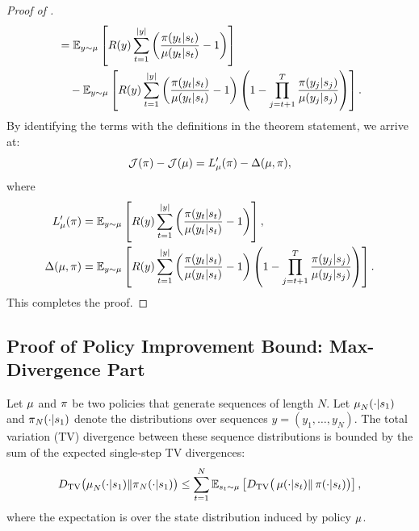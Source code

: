 \begin{proof}[Proof of ]
\begin{align*}
&= \mathbb{E}_{y \sim \rolloutpi} \left[ R(y) \sum_{t=1}^{|y|} \left( \frac{\trainerpi(y_t|s_t)}{\rolloutpi(y_t|s_t)} - 1 \right) \right] \\  
& \quad - \mathbb{E}_{y \sim \rolloutpi} \left[ R(y) \sum_{t=1}^{|y|} \left( \frac{\trainerpi(y_t|s_t)}{\rolloutpi(y_t|s_t)} - 1 \right) \left( 1 -  \prod_{j=t+1}^{T} \frac{\trainerpi(y_j|s_j)}{\rolloutpi(y_j|s_j)}   \right) \right].  
\end{align*}  
By identifying the terms with the definitions in the theorem statement, we arrive at:  
\begin{equation*}  
\mathcal{J}(\trainerpi) - \mathcal{J}(\rolloutpi) = L_{\rolloutpi}'(\trainerpi) - \Delta(\rolloutpi, \trainerpi),  
\end{equation*}  
where  
\begin{align*}  
L_{\rolloutpi}'(\trainerpi) &= \mathbb{E}_{y \sim \rolloutpi} \left[ R(y) \sum_{t=1}^{|y|} \left( \frac{\trainerpi(y_t|s_t)}{\rolloutpi(y_t|s_t)} - 1 \right) \right], \\  
\Delta(\rolloutpi, \trainerpi) &= \mathbb{E}_{y \sim \rolloutpi} \left[ R(y) \sum_{t=1}^{|y|} \left( \frac{\trainerpi(y_t|s_t)}{\rolloutpi(y_t|s_t)} - 1 \right) \left( 1 - \prod_{j=t+1}^{T} \frac{\trainerpi(y_j|s_j)}{\rolloutpi(y_j|s_j)} \right) \right].  
\end{align*}  
This completes the proof.  
\end{proof}


\subsection{Proof of Policy Improvement Bound: Max-Divergence Part}

\begin{lemma}  
\label{lem:sequence_tv_bound}  
Let $\rolloutpi$ and $\trainerpi$ be two policies that generate sequences of length $N$. Let ${\rolloutpi}_N(\cdot|s_1)$ and ${\trainerpi}_N(\cdot|s_1)$ denote the distributions over sequences $y=(y_1, \dots, y_N)$. The total variation (TV) divergence between these sequence distributions is bounded by the sum of the expected single-step TV divergences:  
\begin{equation*}  
D_{\mathrm{TV}}\big({\rolloutpi}_N(\cdot|s_1)  \|  {\trainerpi}_N(\cdot|s_1)\big) \le \sum_{t=1}^{N} \mathbb{E}_{s_t \sim \rolloutpi} \left[ D_{\mathrm{TV}}\big(\rolloutpi(\cdot|s_t) \| \trainerpi(\cdot|s_t)\big) \right],  
\end{equation*}  
where the expectation is over the state distribution induced by policy $\rolloutpi$.  
\end{lemma}  
  
